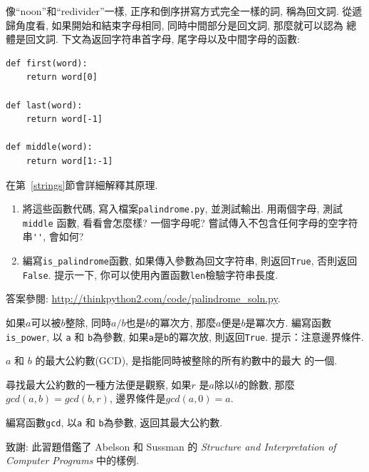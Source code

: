 \documentclass[10pt]{book}
\begin{document}
\begin{exercise}
\label{palindrome}

像``noon''和``redivider''一樣, 正序和倒序拼寫方式完全一樣的詞, 稱為回文詞. 
從遞歸角度看, 如果開始和結束字母相同, 同時中間部分是回文詞, 那麼就可以認為
總體是回文詞. 
下文為返回字符串首字母, 尾字母以及中間字母的函數:

\begin{verbatim}
def first(word):
    return word[0]

def last(word):
    return word[-1]

def middle(word):
    return word[1:-1]
\end{verbatim}
%

在第~\ref{strings}節會詳細解釋其原理.

\begin{enumerate}

\item 將這些函數代碼, 寫入檔案{\tt palindrome.py}, 並測試輸出. 
用兩個字母, 測試 {\tt middle} 函數, 看看會怎麼樣? 一個字母呢?  
嘗試傳入不包含任何字母的空字符串\verb"''",  會如何?

\item 編寫\verb"is_palindrome"函數, 如果傳入參數為回文字符串, 
則返回{\tt True},  否則返回{\tt False}. 
提示一下, 你可以使用內置函數{\tt len}檢驗字符串長度. 

\end{enumerate}

答案參閱: \url{http://thinkpython2.com/code/palindrome_soln.py}.

\end{exercise}

\begin{exercise}

如果$a$可以被$b$整除, 同時$a/b$也是$b$的冪次方, 那麼$a$便是$b$是冪次方. 
編寫函數\verb"is_power", 
以 {\tt a} 和 {\tt b}為參數, 如果{\tt a}是{\tt b}的冪次放, 則返回{\tt True}. 
提示：注意邊界條件. 

\end{exercise}


\begin{exercise}

 $a$ 和 $b$ 的最大公約數(GCD), 是指能同時被整除的所有約數中的最大
的一個. 

尋找最大公約數的一種方法便是觀察, 如果$r$ 是$a$除以$b$的餘數, 
那麼$gcd(a, b) = gcd(b, r)$, 邊界條件是$gcd(a, 0) = a$.

編寫函數\verb"gcd", 以{\tt a} 和 {\tt b}為參數, 返回其最大公約數. 


致謝: 此習題借鑑了 Abelson 和
Sussman 的 {\em Structure and Interpretation of Computer Programs} 中的樣例.

\end{exercise}
\end{document}
